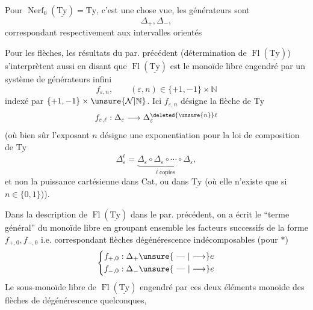 Pour $\operatorname{Nerf}_0(\underline{\mathrm{Ty}})=\mathrm{Ty}$, c'est une chose vue, les générateurs sont
\[
\Delta_+,\Delta_-,
\]
correspondant respectivement aux intervalles orientés


Pour  les flèches, les résultats  \unsure{]} du par. précédent (détermination de $\operatorname{Fl}(\underline{\mathrm{Ty}})$) s'interprètent aussi en disant que $\operatorname{Fl}(\underline{\mathrm{Ty}})$ est le monoïde libre engendré par un système de générateurs infini
\[
f_{\varepsilon,n},\qquad(\varepsilon,n)\in\{+1,-1\}\times\mathbb N
\]
indexé par   $\{+1,-1\}\times\unsure{\mathcal N|\mathbb N}$. Ici $f_{\varepsilon,n}$ désigne la  flèche de $\mathrm{Ty}$
\[
f_{\varepsilon,\ell}:\Delta_\varepsilon\longrightarrow\Delta_\varepsilon^{\deleted{\unsure{n}}\ell}
\]
(où bien sûr l'exposant $n$ désigne une exponentiation pour la loi de composition de $\underline{\mathrm{Ty}}$
\[
\Delta_\varepsilon^\ell=\underbrace{\Delta_\varepsilon\circ\Delta_\varepsilon\circ\cdots\circ\Delta_\varepsilon}_{\ell\ \text{copies}},
\]
et non la puissance cartésienne dans $\mathrm{Cat}$, ou dans $\underline{\mathrm{Ty}}$ (où elle n'existe que si $n\in\{0,1\}$)).

 Dans la description de $\operatorname{Fl}(\underline{\mathrm{Ty}})$ dans le par. précédent, on a écrit le ``terme général'' du monoïde libre en groupant ensemble les  facteurs successifs de la forme $f_{+,0}, f_{-,0}$ i.e. correspondant  flèches  dégénérescence indécomposables (pour $*$)
\[
\left\{\begin{aligned}
 f_{+,0}:{}&\Delta_+\unsure{\text{ --- }|\longrightarrow}e\\
 f_{-,0}:{}&\Delta_-\unsure{\text{ --- }|\longrightarrow}e
\end{aligned}\right.
\]
Le  sous-monoïde libre de $\operatorname{Fl}(\underline{\mathrm{Ty}})$ engendré par ces deux éléments  monoïde des flèches de dégénérescence  quelconques,

